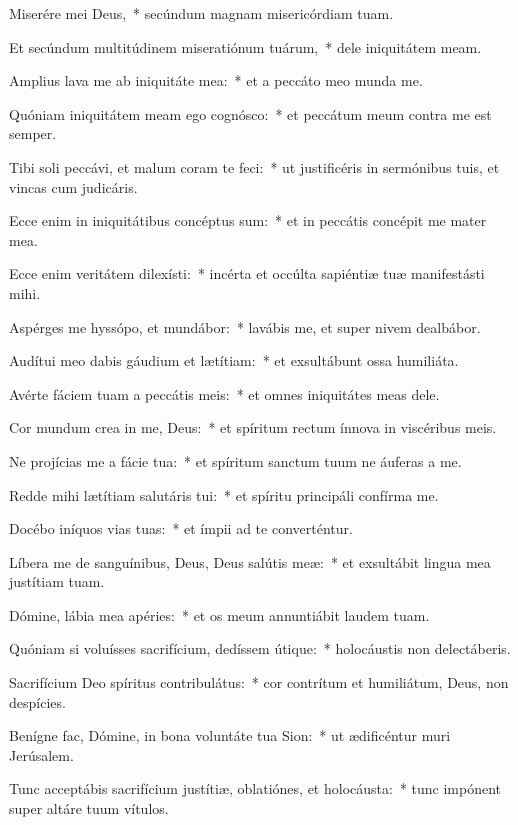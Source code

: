 \item Miserére mei Deus,~* secúndum magnam misericórdiam tuam.

\item Et secúndum multitúdinem miseratiónum tuárum,~* dele iniquitátem meam.

\item Amplius lava me ab iniquitáte mea:~* et a peccáto meo munda me.

\item Quóniam iniquitátem meam ego cognósco:~* et peccátum meum contra me est semper.

\item Tibi soli peccávi, et malum coram te feci:~* ut justificéris in sermónibus tuis, et vincas cum judicáris.

\item Ecce enim in iniquitátibus concéptus sum:~* et in peccátis concépit me mater mea.

\item Ecce enim veritátem dilexísti:~* incérta et occúlta sapiéntiæ tuæ manifestásti mihi.

\item Aspérges me hyssópo, et mundábor:~* lavábis me, et super nivem dealbábor.

\item Audítui meo dabis gáudium et lætítiam:~* et exsultábunt ossa humiliáta.

\item Avérte fáciem tuam a peccátis meis:~* et omnes iniquitátes meas dele.

\item Cor mundum crea in me, Deus:~* et spíritum rectum ínnova in viscéribus meis.

\item Ne projícias me a fácie tua:~* et spíritum sanctum tuum ne áuferas a me.

\item Redde mihi lætítiam salutáris tui:~* et spíritu principáli confírma me.

\item Docébo iníquos vias tuas:~* et ímpii ad te converténtur.

\item Líbera me de sanguínibus, Deus, Deus salútis meæ:~* et exsultábit lingua mea justítiam tuam.

\item Dómine, lábia mea apéries:~* et os meum annuntiábit laudem tuam.

\item Quóniam si voluísses sacrifícium, dedíssem útique:~* holocáustis non delectáberis.

\item Sacrifícium Deo spíritus contribulátus:~* cor contrítum et humiliátum, Deus, non despícies.

\item Benígne fac, Dómine, in bona voluntáte tua Sion:~* ut ædificéntur muri Jerúsalem.

\item Tunc acceptábis sacrifícium justítiæ, oblatiónes, et holocáusta:~* tunc impónent super altáre tuum vítulos.